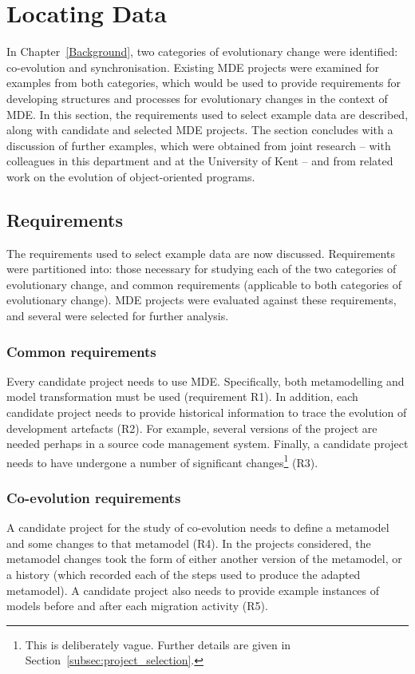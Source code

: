 \section{Locating Data}
\label{sec:locating_data}
In Chapter~\ref{Background}, two categories of evolutionary change were identified: co-evolution and synchronisation. Existing MDE projects were examined for examples from both categories, which would be used to provide requirements for developing structures and processes for evolutionary changes in the context of MDE. In this section, the requirements used to select example data are described, along with candidate and selected MDE projects. The section concludes with a discussion of further examples, which were obtained from joint research -- with colleagues in this department and at the University of Kent -- and from related work on the evolution of object-oriented programs.  

\subsection{Requirements}
The requirements used to select example data are now discussed. Requirements were partitioned into: those necessary for studying each of the two categories of evolutionary change, and common requirements (applicable to both categories of evolutionary change). MDE projects were evaluated against these requirements, and several were selected for further analysis.

\subsubsection{Common requirements}
Every candidate project needs to use MDE. Specifically, both metamodelling and model transformation must be used (requirement R1). In addition, each candidate project needs to provide historical information to trace the evolution of development artefacts (R2). For example, several versions of the project are needed perhaps in a source code management system. Finally, a candidate project needs to have undergone a number of significant changes\footnote{This is deliberately vague. Further details are given in Section~\ref{subsec:project_selection}.} (R3).

\subsubsection{Co-evolution requirements}
A candidate project for the study of co-evolution needs to define a metamodel and some changes to that metamodel (R4). In the projects considered, the metamodel changes took the form of either another version of the metamodel, or a history (which recorded each of the steps used to produce the adapted metamodel). A candidate project also needs to provide example instances of models before and after each migration activity (R5).

